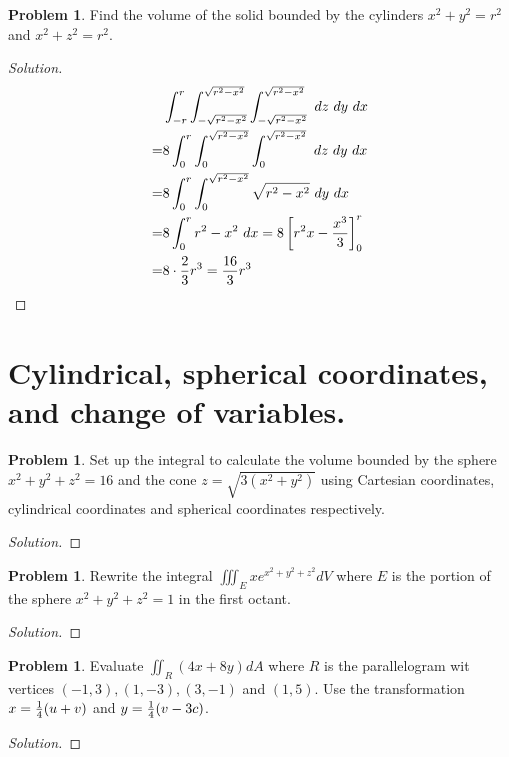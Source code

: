 \documentclass[12pt]{amsart}%
\theoremstyle{plain}
\theoremstyle{definition}
\newtheorem{prob}[theorem]{Problem}
\theoremstyle{special}
\newcommand{\sol}[1]{
{\begin{proof}[Solution]#1\end{proof}}
}
\newcommand{\Prob}[1]{\begin{tcolorbox}%
\begin{prob}
	#1
\end{prob}
\end{tcolorbox}	
}
\begin{document}
\Prob{ Find the volume of the solid bounded by the cylinders $x^2+y^2=r^2$ and $x^2+z^2=r^2$.}
\sol{
\begin{align*}
&\int_{-r}^{r}\int_{-\sqrt{r^2-x^2}}^{\sqrt{r^2-x^2}}\int_{-\sqrt{r^2-x^2}}^{\sqrt{r^2-x^2}}\ dz\ dy\ dx\\
=&	8\int_{0}^{r}\int_{0}^{\sqrt{r^2-x^2}}\int_{0}^{\sqrt{r^2-x^2}}\ dz\ dy\ dx\\
=& 8 \int_0^{r}\int_{0}^{\sqrt{r^2-x^2}}\sqrt{r^2-x^2} \ dy\ dx\\
=&8 \int_0^{r}r^2-x^2 \ dx=8\left[r^2x-{x^3\over 3} \right]^r_0\\=&8\cdot {2\over 3}r^3={16\over 3}r^3\qedhere
\end{align*}
}
\section{Cylindrical, spherical coordinates, and change of variables.}
\Prob{Set up the integral to calculate the volume bounded by the sphere $x^2+y^2+z^2=16$ and the cone $z=\sqrt{3(x^2+y^2)}$ using Cartesian coordinates, cylindrical coordinates and spherical coordinates respectively.}
\sol{}
\Prob{Rewrite the integral $\displaystyle \iiint_E xe^{x^2+y^2+z^2} dV$ where $E$ is the portion of the sphere $x^2+y^2+z^2=1$ in the first octant.}
\sol{}
\Prob{Evaluate $\iint_R(4x+8y)dA$ where $R$ is the parallelogram wit vertices $(-1,3),(1,-3),(3,-1)$ and $(1,5)$. Use the transformation $x={1\over 4}(u+v)$ and $y={1\over 4}(v-3c)$.}
\sol{}

\newpage
\end{document}
